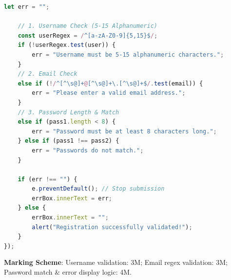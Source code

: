 \begin{solutionbox}
\begin{enumerate}[start=7]
\begin{lstlisting}[language=JavaScript]
    let err = "";

    // 1. Username Check (5-15 Alphanumeric)
    const userRegex = /^[a-zA-Z0-9]{5,15}$/;
    if (!userRegex.test(user)) {
        err = "Username must be 5-15 alphanumeric characters.";
    }
    // 2. Email Check
    else if (!/^[^\s@]+@[^\s@]+\.[^\s@]+$/.test(email)) {
        err = "Please enter a valid email address.";
    }
    // 3. Password Length & Match
    else if (pass1.length < 8) {
        err = "Password must be at least 8 characters long.";
    } else if (pass1 !== pass2) {
        err = "Passwords do not match.";
    }

    if (err !== "") {
        e.preventDefault(); // Stop submission
        errBox.innerText = err;
    } else {
        errBox.innerText = "";
        alert("Registration successfully validated!");
    }
});
\end{lstlisting}
\textbf{Marking Scheme}: Username validation: 3M; Email regex validation: 3M; Password match \& error display logic: 4M.
\end{enumerate}
\end{solutionbox}
